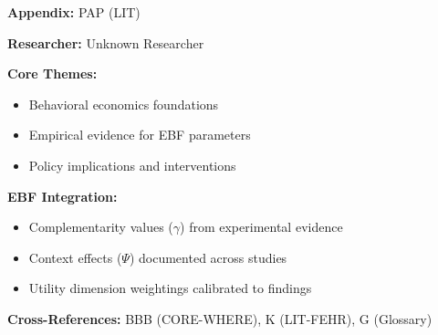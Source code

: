 \begin{tcolorbox}[colback=blue!5!white, colframe=blue!75!black,
    title=Quick Reference: Unknown Researcher Research]

\textbf{Appendix:} PAP (LIT)

\textbf{Researcher:} Unknown Researcher

\textbf{Core Themes:}
\begin{itemize}[nosep]
\item Behavioral economics foundations
\item Empirical evidence for EBF parameters
\item Policy implications and interventions
\end{itemize}

\textbf{EBF Integration:}
\begin{itemize}[nosep]
\item Complementarity values ($\gamma$) from experimental evidence
\item Context effects ($\Psi$) documented across studies
\item Utility dimension weightings calibrated to findings
\end{itemize}

\textbf{Cross-References:} BBB (CORE-WHERE), K (LIT-FEHR), G (Glossary)
\end{tcolorbox}


